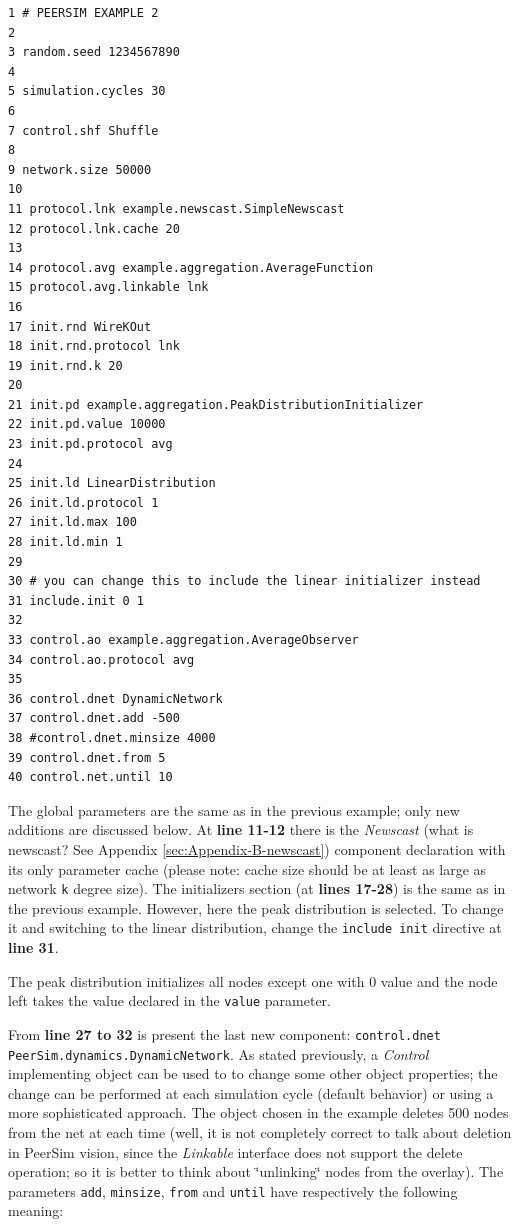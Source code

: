 \documentclass[a4paper,11pt]{article}
\begin{document}
\footnotesize
\begin{verbatim}
1 # PEERSIM EXAMPLE 2
2
3 random.seed 1234567890
4
5 simulation.cycles 30
6
7 control.shf Shuffle
8
9 network.size 50000
10 
11 protocol.lnk example.newscast.SimpleNewscast
12 protocol.lnk.cache 20
13
14 protocol.avg example.aggregation.AverageFunction
15 protocol.avg.linkable lnk
16
17 init.rnd WireKOut
18 init.rnd.protocol lnk
19 init.rnd.k 20
20
21 init.pd example.aggregation.PeakDistributionInitializer
22 init.pd.value 10000
23 init.pd.protocol avg
24
25 init.ld LinearDistribution
26 init.ld.protocol 1
27 init.ld.max 100
28 init.ld.min 1
29
30 # you can change this to include the linear initializer instead
31 include.init 0 1 
32
33 control.ao example.aggregation.AverageObserver
34 control.ao.protocol avg
35
36 control.dnet DynamicNetwork
37 control.dnet.add -500
38 #control.dnet.minsize 4000
39 control.dnet.from 5
40 control.net.until 10
\end{verbatim}
\normalsize

The global parameters are the same as in the previous example; only
new additions are discussed below. At \textbf{line 11-12} there is the
\emph{Newscast} (what is newscast? See Appendix \ref{sec:Appendix-B-newscast}) 
component declaration with its 
only parameter cache (please note: cache size should be at least as
large as network \texttt{k} degree size). 
The initializers section (at \textbf{lines 17-28}) is the same as in
the previous example. However, here the peak distribution is
selected. To change it and switching to the linear distribution,
change the \texttt{include init} directive at \textbf{line 31}.

The
peak distribution initializes all nodes except one with 0 value and
the node left takes the value declared in the \texttt{value} parameter.

From \textbf{line 27 to 32} is present the last new component: 
\texttt{control.dnet
PeerSim.dynamics.DynamicNetwork}. As stated previously, a \emph{Control}
implementing object can be used to to change some other object
properties; the change can be performed at each simulation cycle (default
behavior) or using a more sophisticated approach. The object chosen
in the example deletes 500 nodes from the net at each time (well,
it is not completely correct to talk about deletion in PeerSim vision,
since the \emph{Linkable} interface does not support the delete
operation; so it is better to think about \char`\"{}unlinking\char`\"{} 
nodes from the overlay). The parameters \texttt{add}, \texttt{minsize},
\texttt{from} and \texttt{until} have respectively the following meaning:
\end{document}

